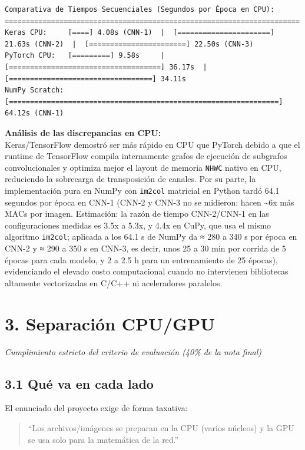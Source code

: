 \documentclass[
  11pt,
]{article}
\begin{document}
\begin{verbatim}
Comparativa de Tiempos Secuenciales (Segundos por Época en CPU):
======================================================================
Keras CPU:     [====] 4.08s (CNN-1)  |  [======================] 21.63s (CNN-2)  |  [=======================] 22.50s (CNN-3)
PyTorch CPU:   [=========] 9.58s     |  [====================================] 36.17s  |  [==================================] 34.11s
NumPy Scratch: [================================================================] 64.12s (CNN-1)
\end{verbatim}

\textbf{Análisis de las discrepancias en CPU:}\\
Keras/TensorFlow demostró ser más rápido en CPU que PyTorch
debido a que el runtime de TensorFlow compila internamente
grafos de ejecución de subgrafos convolucionales y optimiza
mejor el layout de memoria \texttt{NHWC} nativo en CPU,
reduciendo la sobrecarga de transposición de canales. Por su
parte, la implementación pura en NumPy con \texttt{im2col}
matricial en Python tardó 64.1 segundos por época en CNN-1
(CNN-2 y CNN-3 no se midieron: hacen \textasciitilde6x más
MACs por imagen. Estimación: la razón de tiempo CNN-2/CNN-1
en las configuraciones medidas es 3.5x a 5.3x, y 4.4x en
CuPy, que usa el mismo algoritmo \texttt{im2col}; aplicada a
los 64.1 s de NumPy da ≈ 280 a 340 s por época en CNN-2 y ≈
290 a 350 s en CNN-3, es decir, unos 25 a 30 min por corrida
de 5 épocas para cada modelo, y 2 a 2.5 h para un
entrenamiento de 25 épocas), evidenciando el elevado costo
computacional cuando no intervienen bibliotecas altamente
vectorizadas en C/C++ ni aceleradores paralelos.

\clearpage
\section{3. Separación CPU/GPU}\label{oportunidades-de-paralelizaciuxf3n-y-separaciuxf3n-cpugpu-paso-3}

\emph{Cumplimiento estricto del criterio de evaluación (40\%
de la nota final)}

\subsection{3.1 Qué va en cada lado}\label{justificaciuxf3n-teuxf3rica-de-la-separaciuxf3n-de-roles}

El enunciado del proyecto exige de forma taxativa:

\begin{quote}
``Los archivos/imágenes se preparan en la CPU
(varios núcleos) y la GPU se usa solo para la matemática de
la red.''
\end{quote}
\end{document}
